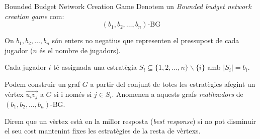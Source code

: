 \documentclass[aspectratio=169]{beamer}
\begin{document}
\begin{frame}{Bounded Budget Network Creation Game}
    Denotem un \emph{Bounded budget network creation game} com:
    $$ (b_1, b_2, \dots , b_n)\text{-BG} $$
    
    On $b_1,b_2, \dots , b_n$ són enters no negatius que representen el pressupost de cada jugador ($n$ és el nombre de jugadors).
    
    \vspace{1em}
    
    Cada jugador $i$ té assignada una estratègia $S_i \subseteq \{1, 2, \dots , n\} \backslash \{i\}$ amb
    $|S_i| = b_i$.
    
    \vspace{1em}
    
    Podem construir un graf $G$ a partir del conjunt de totes les estratègies afegint un vèrtex $\overrightarrow{u_iv_j}$
    a $G$ si i només si $j \in S_i$. Anomenen a aquests grafs \emph{realitzadors} de
    $ (b_1, b_2, \dots , b_n)\text{-BG} $.
    
    \vspace{1em}
    
    Direm que un vèrtex està en la millor resposta (\emph{best response}) si no pot disminuir el seu
    cost mantenint fixes les estratègies de la resta de vèrtexs.
\end{frame}
\end{document}
